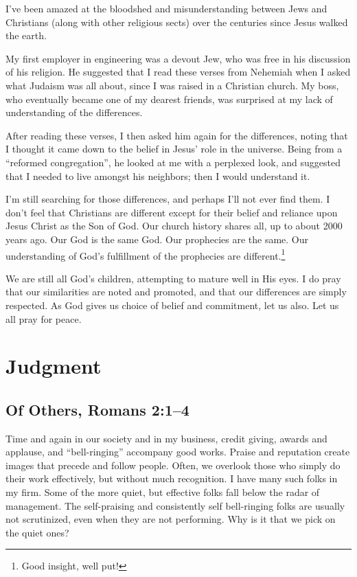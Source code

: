 \documentclass[12pt]{memoir}
\begin{document}
I've been amazed at the bloodshed and misunderstanding between Jews and Christians (along with other religious sects) over the centuries since Jesus walked the earth.

My first employer in engineering was a devout Jew, who was free in his discussion of his religion. He suggested that I read these verses from Nehemiah when I asked what Judaism was all about, since I was raised in a Christian church. My boss, who eventually became one of my dearest friends, was surprised at my lack
of understanding of the differences. 


After reading these verses, I then asked him again for the differences,
noting that I thought it came down to the belief in Jesus' role in
the universe. Being from a ``reformed congregation'', he looked
at me with a perplexed look, and suggested that I needed to live amongst
his neighbors; then I would understand it.

I'm still searching for those differences, and perhaps I'll not ever find them. I don't feel that Christians are different except for their belief and reliance upon Jesus Christ as the Son of God. Our church history shares all, up to about 2000 years ago. Our God is the same God. Our prophecies are the same. Our understanding of God's fulfillment of the prophecies are different.\footnote{Good insight, well put!}

We are still all God's children, attempting to mature well in His
eyes. I do pray that our similarities are noted and promoted, and
that our differences are simply respected. As God gives us choice
of belief and commitment, let us also. Let us all pray for peace.

\section{Judgment}

\subsection[Of Others]{Of Others, Romans 2:1--4}

Time and again in our society and in my business, credit giving, awards
and applause, and ``bell-ringing'' accompany good works. Praise
and reputation create images that precede and follow people. Often,
we overlook those who simply do their work effectively, but without
much recognition. I have many such folks in my firm. Some of the more
quiet, but effective folks fall below the radar of management.
The self-praising and consistently self bell-ringing folks are usually not scrutinized, even when they are not performing. Why is
it that we pick on the quiet ones?
\end{document}
